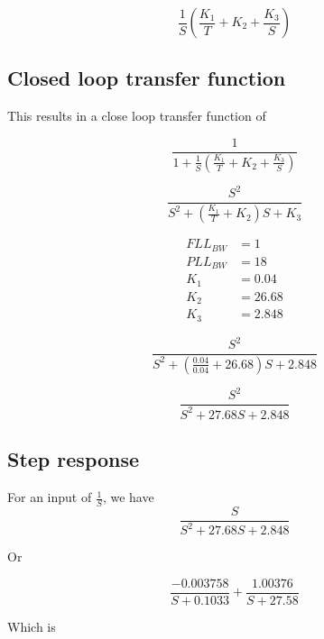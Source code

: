 \begin{equation}
\frac{1}{S} (\frac{K_1}{T} + K_2 +  \frac{K_3}{S})
\end{equation}

 
\subsection{Closed loop transfer function}
This results in a close loop transfer function of 

\begin{equation}
\frac{1}{1+\frac{1}{S} (\frac{K_1}{T} + K_2 +  \frac{K_3}{S})}
\end{equation}



\begin{equation}
\frac{S^2}{S^2 + (\frac{K_1}{T} + K_2)S + K_3}
\end{equation}

\begin{framed}
\begin{align*}
FLL_{BW} &=1\\
PLL_{BW} &=18\\
K_1 &=  0.04\\
K_2 &= 26.68\\
K_3 &=  2.848
\end{align*}
\end{framed}

\begin{equation}
\frac{S^2}{S^2 + (\frac{0.04}{0.04} +  26.68)S + 2.848}
\end{equation}

\begin{equation}
\frac{S^2}{S^2 + 27.68 S + 2.848}
\end{equation}

\subsection{Step response}

For an input of $\frac{1}{S}$, we have 
\begin{equation}
\frac{S}{S^2 + 27.68 S + 2.848}
\end{equation}

Or 

\begin{equation}
\frac{-0.003758}{S+0.1033} + \frac{1.00376}{S+27.58}
\end{equation}

Which is

